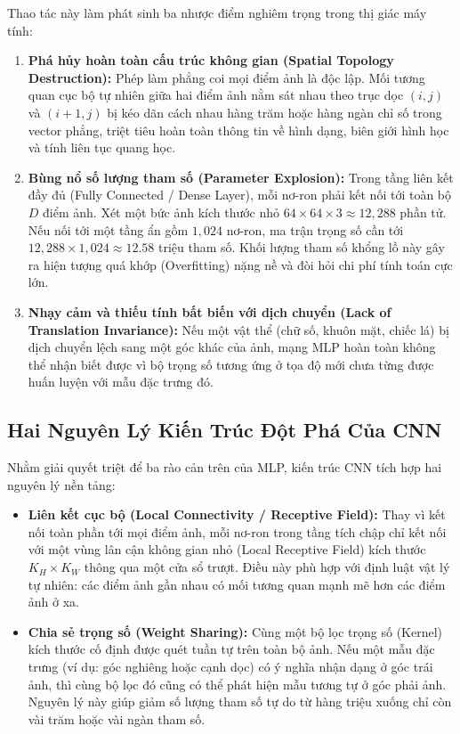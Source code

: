 \documentclass[12pt,a4paper]{report}
\begin{document}
Thao tác này làm phát sinh ba nhược điểm nghiêm trọng trong thị giác máy tính:
\begin{enumerate}[leftmargin=1.5em]
    \item \textbf{Phá hủy hoàn toàn cấu trúc không gian (Spatial Topology Destruction):} Phép làm phẳng coi mọi điểm ảnh là độc lập. Mối tương quan cục bộ tự nhiên giữa hai điểm ảnh nằm sát nhau theo trục dọc $(i, j)$ và $(i+1, j)$ bị kéo dãn cách nhau hàng trăm hoặc hàng ngàn chỉ số trong vector phẳng, triệt tiêu hoàn toàn thông tin về hình dạng, biên giới hình học và tính liên tục quang học.
    \item \textbf{Bùng nổ số lượng tham số (Parameter Explosion):} Trong tầng liên kết đầy đủ (Fully Connected / Dense Layer), mỗi nơ-ron phải kết nối tới toàn bộ $D$ điểm ảnh. Xét một bức ảnh kích thước nhỏ $64 \times 64 \times 3 \approx 12,288$ phần tử. Nếu nối tới một tầng ẩn gồm $1,024$ nơ-ron, ma trận trọng số cần tới $12,288 \times 1,024 \approx 12.58$ triệu tham số. Khối lượng tham số khổng lồ này gây ra hiện tượng quá khớp (Overfitting) nặng nề và đòi hỏi chi phí tính toán cực lớn.
    \item \textbf{Nhạy cảm và thiếu tính bất biến với dịch chuyển (Lack of Translation Invariance):} Nếu một vật thể (chữ số, khuôn mặt, chiếc lá) bị dịch chuyển lệch sang một góc khác của ảnh, mạng MLP hoàn toàn không thể nhận biết được vì bộ trọng số tương ứng ở tọa độ mới chưa từng được huấn luyện với mẫu đặc trưng đó.
\end{enumerate}

\subsection{Hai Nguyên Lý Kiến Trúc Đột Phá Của CNN}
Nhằm giải quyết triệt để ba rào cản trên của MLP, kiến trúc CNN tích hợp hai nguyên lý nền tảng:
\begin{itemize}[leftmargin=2em]
    \item \textbf{Liên kết cục bộ (Local Connectivity / Receptive Field):} Thay vì kết nối toàn phần tới mọi điểm ảnh, mỗi nơ-ron trong tầng tích chập chỉ kết nối với một vùng lân cận không gian nhỏ (Local Receptive Field) kích thước $K_H \times K_W$ thông qua một cửa sổ trượt. Điều này phù hợp với định luật vật lý tự nhiên: các điểm ảnh gần nhau có mối tương quan mạnh mẽ hơn các điểm ảnh ở xa.
    \item \textbf{Chia sẻ trọng số (Weight Sharing):} Cùng một bộ lọc trọng số (Kernel) kích thước cố định được quét tuần tự trên toàn bộ ảnh. Nếu một mẫu đặc trưng (ví dụ: góc nghiêng hoặc cạnh dọc) có ý nghĩa nhận dạng ở góc trái ảnh, thì cùng bộ lọc đó cũng có thể phát hiện mẫu tương tự ở góc phải ảnh. Nguyên lý này giúp giảm số lượng tham số tự do từ hàng triệu xuống chỉ còn vài trăm hoặc vài ngàn tham số.
\end{itemize}
\end{document}
